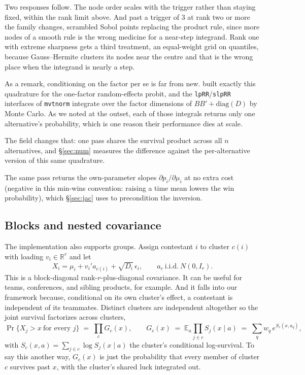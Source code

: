 \documentclass[11pt]{article}
\newcommand{\R}{\mathbb{R}}
\newcommand{\E}{\mathbb{E}}
\begin{document}
Two responses follow. The node order scales with the trigger rather
than staying fixed, within the rank limit above. And past a trigger of
$3$ at rank two or more the
family changes, scrambled Sobol points replacing the product rule, since
more nodes of a smooth rule is the wrong medicine for a near-step
integrand. Rank one with extreme sharpness gets a third treatment, an
equal-weight grid on quantiles, because Gauss--Hermite clusters its nodes
near the centre and that is the wrong place when the integrand is nearly
a step.

As a remark, conditioning on the factor per se is far from new.
\citet{butler1982} built exactly this quadrature for the one-factor
random-effects probit, and the \texttt{lpRR}/\texttt{slpRR} interfaces of
\texttt{mvtnorm} integrate over the factor dimensions of
$BB'+\mathrm{diag}(D)$ by Monte Carlo. As we noted at the outset, each of
those integrals returns only one alternative's probability, which is one
reason their performance dies at scale.

The field changes that: one pass shares the survival product across all
$n$ alternatives, and \S\ref{sec:num} measures the difference against the
per-alternative version of this same quadrature.

The same pass returns the own-parameter slopes $\partial p_i/\partial\mu_i$
at no extra cost (negative in this min-wins convention: raising a time
mean lowers the win probability), which \S\ref{sec:jac} uses to
precondition the inversion.

\subsection{Blocks and nested covariance}\label{sec:blocks}

The implementation also supports groups. Assign contestant $i$ to cluster $c(i)$ with loading $v_i\in\R^r$ and let
\begin{equation}
X_i=\mu_i+v_i'a_{c(i)}+\sqrt{D_i}\,\epsilon_i,
\qquad a_c \ \text{i.i.d.}\ N(0,I_r).
\end{equation}
This is a block-diagonal rank-$r$-plus-diagonal covariance. It can be useful for teams, conferences, and sibling
products, for example. And it falls into our framework because, conditional on its own cluster's effect, a contestant is independent of its teammates. Distinct clusters are
independent altogether so the joint survival factorizes across clusters,
\begin{equation}\label{eq:blockfield}
\Pr\{X_j>x\ \text{for every } j\} \;=\; \prod_c G_c(x),
\qquad
G_c(x)\;=\;\E_a \prod_{j\in c} S_j(x\mid a)
       \;=\;\sum_q w_q\, e^{S_c(x,a_q)},
\end{equation}
with $S_c(x,a)=\sum_{j\in c}\log S_j(x\mid a)$ the cluster's conditional
log-survival. To say this another way, $G_c(x)$ is just the probability that every member of
cluster $c$ survives past $x$, with the cluster's shared luck integrated out.
\end{document}

